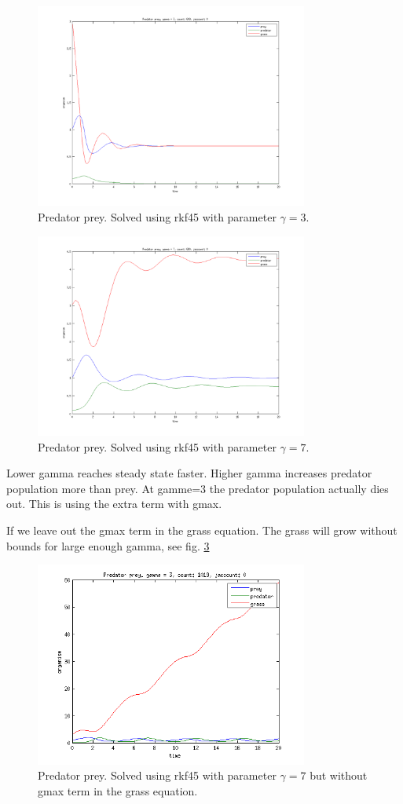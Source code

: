 \begin{figure}[h!]
	\centering
	\includegraphics[width=0.8\textwidth]{img/exc3_3}
	\caption{Predator prey. Solved using rkf45 with parameter $\gamma = 3$.}
	\label{fig:exc3_3}
\end{figure}


\begin{figure}[h!]
	\centering
	\includegraphics[width=0.8\textwidth]{img/exc3_7}
	\caption{Predator prey. Solved using rkf45 with parameter $\gamma = 7$.}
	\label{fig:exc3_7}
\end{figure}

Lower gamma reaches steady state faster. Higher gamma increases predator population more than prey. At gamme=3 the predator population actually dies out.
This is using the extra term with gmax.

If we leave out the gmax term in the grass equation. The grass will grow without bounds for large enough gamma, see fig. \ref{fig:exc3_7_gmax}

\begin{figure}[h!]
	\centering
	\includegraphics[width=0.8\textwidth]{img/exc3_7_gmax}
	\caption{Predator prey. Solved using rkf45 with parameter $\gamma = 7$ but without gmax term in the grass equation.}
	\label{fig:exc3_7_gmax}
\end{figure}